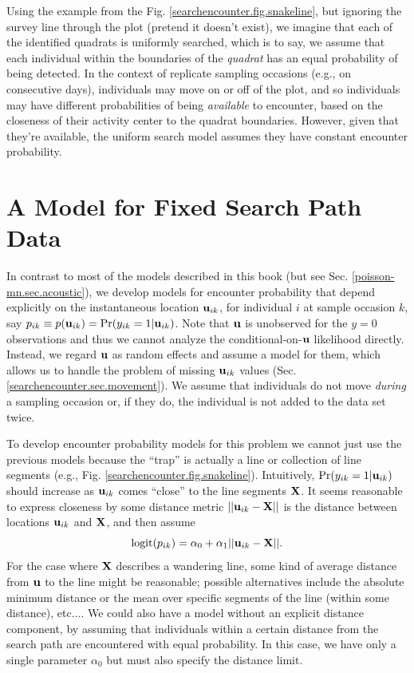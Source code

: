 Using the example from the Fig. \ref{searchencounter.fig.snakeline},
but ignoring the survey line through the plot (pretend it doesn't
exist), we imagine that each of the identified quadrats is uniformly
searched, which is to say, we assume that each individual within the
boundaries of the {\it quadrat} has an equal probability of being
detected.  In the context of replicate sampling occasions (e.g., on
consecutive days), individuals may move on or off of the plot, and so
individuals may have different probabilities of being {\it available}
to encounter, based on the closeness of their activity center to the
quadrat boundaries. However, given that they're available, the uniform
search model assumes they have constant encounter probability.



\section{A Model for Fixed Search Path Data}


In contrast to most of the models described in this book (but see
Sec. \ref{poisson-mn.sec.acoustic}), we develop models for encounter
probability that depend explicitly on the instantaneous location ${\bf
  u}_{ik}$, for individual $i$ at sample occasion $k$, say $p_{ik}
\equiv p({\bf u}_{ik}) = \Pr(y_{ik}=1|{\bf u}_{ik})$.  Note that ${\bf
  u}$ is unobserved for the $y=0$ observations and thus we cannot
analyze the conditional-on-${\bf u}$ likelihood directly. Instead, we
regard ${\bf u}$ as random effects and assume a model for them, which
allows us to handle the problem of missing ${\bf u}_{ik}$ values
(Sec. \ref{searchencounter.sec.movement}).  We assume that individuals
do not move {\it during} a sampling occasion or, if they do, the
individual is not added to the data set twice.

To develop encounter probability models for this problem we cannot
just use the previous models because the ``trap'' is actually a line
or collection of line segments (e.g.,
Fig. \ref{searchencounter.fig.snakeline}).  Intuitively,
$\Pr(y_{ik}=1|{\bf u}_{ik})$ should increase as ${\bf u}_{ik}$ comes
``close'' to the line segments ${\bf X}$. It seems reasonable to
express closeness by some distance metric $||{\bf u}_{ik} - {\bf X}
||$ is the distance between locations ${\bf u}_{ik}$ and ${\bf X}$,
and then assume
\[
\mbox{logit}(p_{ik}) = \alpha_{0} + \alpha_{1} ||{\bf u}_{ik} - {\bf X}||.
\]
For the case where ${\bf X}$ describes a wandering line, some kind of
average distance from ${\bf u}$ to the line might be reasonable;
possible alternatives include the absolute minimum distance or the
mean over specific segments of the line (within some distance),
etc$\dots$.  We could also have a model without an explicit distance
component, by assuming that individuals within a certain distance from
the search path are encountered with equal probability. In this case,
we have only a single parameter $\alpha_{0}$ but must also specify the
distance limit.


